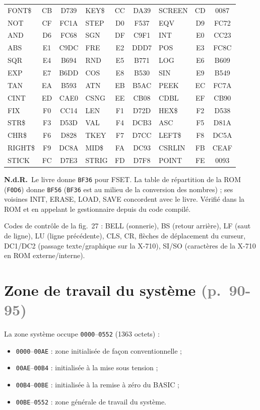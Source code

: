 \documentclass[a4paper,10pt]{article}
\newcommand{\hex}[1]{\texttt{#1}}
\newcommand{\pg}[1]{\texorpdfstring{\textcolor{gray}{\small(p.~#1)}}{}}
\newcommand{\nota}[1]{\textcolor{red!60!black}{\small\textbf{N.d.R.}~#1}}
\begin{document}
{\begin{longtable}{@{}lcc|lcc|lcc@{}}
FONT\$ & CB & D739 & KEY\$ & CC & DA39 & SCREEN & CD & 0087 \\
NOT & CF & FC1A & STEP & D0 & F537 & EQV & D9 & FC72 \\
AND & D6 & FC68 & SGN & DF & C9F1 & INT & E0 & CC23 \\
ABS & E1 & C9DC & FRE & E2 & DDD7 & POS & E3 & FC8C \\
SQR & E4 & B694 & RND & E5 & B771 & LOG & E6 & B609 \\
EXP & E7 & B6DD & COS & E8 & B530 & SIN & E9 & B549 \\
TAN & EA & B593 & ATN & EB & B5AC & PEEK & EC & FC7A \\
CINT & ED & CAE0 & CSNG & EE & CB08 & CDBL & EF & CB90 \\
FIX & F0 & CC14 & LEN & F1 & D72D & HEX\$ & F2 & D538 \\
STR\$ & F3 & D53D & VAL & F4 & DCB3 & ASC & F5 & D81A \\
CHR\$ & F6 & D828 & TKEY & F7 & D7CC & LEFT\$ & F8 & DC5A \\
RIGHT\$ & F9 & DC8A & MID\$ & FA & DC93 & CSRLIN & FB & CEAF \\
STICK & FC & D7E3 & STRIG & FD & D7F8 & POINT & FE & 0093 \\
\end{longtable}
\nota{Le livre donne \hex{BF36} pour FSET. La table de répartition de la ROM
(\hex{F0D6}) donne \hex{BF56} (\hex{BF36} est au milieu de la conversion des
nombres) ; ses voisines INIT, ERASE, LOAD, SAVE concordent avec le livre.
Vérifié dans la ROM et en appelant le gestionnaire depuis du code compilé.}
}
Codes de contrôle de la fig.~27 : BELL (sonnerie), BS (retour arrière), LF
(saut de ligne), LU (ligne précédente), CLS, CR, flèches de déplacement du
curseur, DC1/DC2 (passage texte/graphique sur la X-710), SI/SO (caractères
de la X-710 en ROM externe/interne).

\section{Zone de travail du système \pg{90-95}}\label{sec:zone}

La zone système occupe \hex{0000}--\hex{0552} (1363 octets) :
\begin{itemize}
  \item \hex{0000}--\hex{00AE} : zone initialisée de façon conventionnelle ;
  \item \hex{00AE}--\hex{00B4} : initialisée à la mise sous tension ;
  \item \hex{00B4}--\hex{00BE} : initialisée à la remise à zéro du BASIC ;
  \item \hex{00BE}--\hex{0552} : zone générale de travail du système.
\end{itemize}
\end{document}
